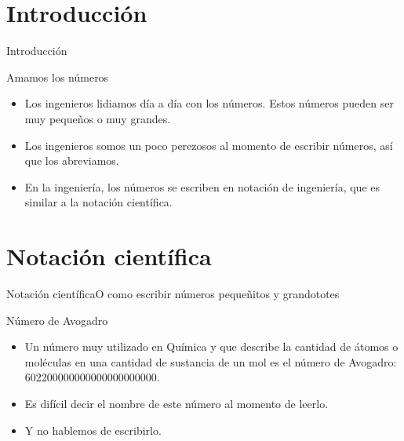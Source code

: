 \documentclass[10pt]{beamer}
\begin{document}


\section{Introducción}
\begin{frame}{Introducción}{}

\begin{block}{Amamos los números}
\begin{itemize}
    \item Los ingenieros lidiamos día a día con los números. Estos números pueden ser muy pequeños o muy grandes.
    \item Los ingenieros somos un poco perezosos al momento de escribir números, así que los abreviamos.
    \item En la ingeniería, los números se escriben en notación de ingeniería, que es similar a la notación científica.
\end{itemize}
\end{block}

\end{frame}

\section{Notación científica}

\begin{frame}{Notación científica}{O como escribir números pequeñitos y grandototes}
\begin{block}{Número de Avogadro}
\begin{itemize}
    \item Un número muy utilizado en Química y que describe la cantidad de átomos o moléculas en una cantidad de sustancia de un mol es el número de Avogadro: 602200000000000000000000.
    \item Es difícil decir el nombre de este número al momento de leerlo.
    \item Y no hablemos de escribirlo.
\end{itemize}
\end{block}
\end{frame}
\end{document}
